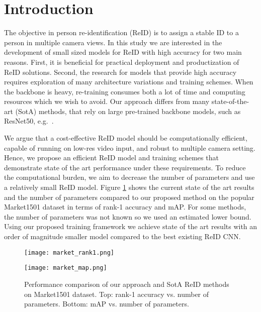 \documentclass[sigconf]{acmart}
\begin{document}
\section{Introduction}

The objective in person re-identification (ReID) is to assign a stable ID to a person in multiple camera views.
In this study we are interested in the development of small sized models for ReID with high accuracy for two main reasons. First, it is beneficial for practical deployment and productization of ReID solutions.
Second, the research for models that provide high accuracy requires exploration of many architecture variations and training schemes.
When the backbone is heavy, re-training consumes both a lot of time and computing resources which we wish to avoid.
Our approach differs from many state-of-the-art (SotA) methods, that rely on large pre-trained backbone models, such as ResNet50, e.g.~\cite{wu2019deep,sun2018pcb,wang2018mancs,luo2019bag}.

We argue that a cost-effective ReID model should be computationally efficient, capable of running on low-res video input, and robust to multiple camera setting.
Hence, we propose an efficient ReID model and training schemes that demonstrate state of the art performance under these requirements.
To reduce the computational burden, we aim to decrease the number of parameters and use a relatively small ReID model. Figure \ref{fig:param_market} shows the current state of the art results \cite{chen2018dnncrf,li2018harmonious,luo2019bag,quan2019auto,si2018dual,sun2018pcb,wang2018mancs,yang2018local,zheng2018pyramid,zhang2019densely,zhang2019relation,wang2018learning,chen2019abd,zhou2019omni} and the number of parameters compared to our proposed method on the popular Market1501 dataset \cite{zheng2015market} in terms of rank-1 accuracy and mAP. For some methods, the number of parameters was not known so we used an estimated lower bound. Using our proposed training framework we achieve state of the art results with an order of magnitude smaller model compared to the best existing ReID CNN.

\begin{figure}
\centering
\begin{minipage}[b]{0.45\textwidth}
\texttt{[image: market\_rank1.png]}
\end{minipage}

\centering
\begin{minipage}[b]{0.45\textwidth}
\texttt{[image: market\_map.png]}
\end{minipage}
\caption{Performance comparison of our approach and SotA ReID methods on Market1501 dataset. Top: rank-1 accuracy vs. number of parameters. Bottom: mAP vs. number of parameters.}\label{fig:param_market}
\end{figure}
\end{document}
